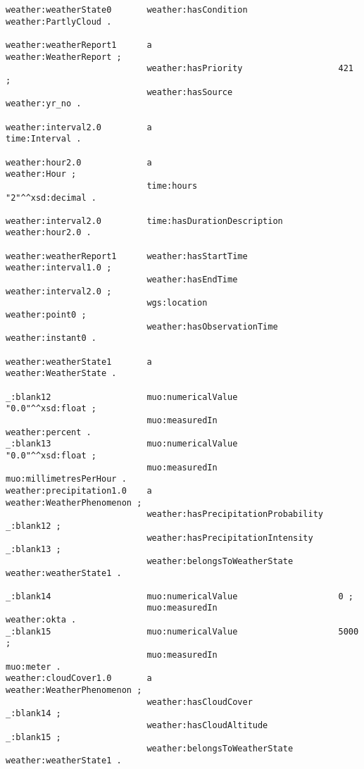 \begin{lstlisting}
weather:weatherState0       weather:hasCondition                  weather:PartlyCloud .

weather:weatherReport1      a                                     weather:WeatherReport ;
                            weather:hasPriority                   421 ;
                            weather:hasSource                     weather:yr_no .

weather:interval2.0         a                                     time:Interval .

weather:hour2.0             a                                     weather:Hour ;
                            time:hours                            "2"^^xsd:decimal .

weather:interval2.0         time:hasDurationDescription           weather:hour2.0 .

weather:weatherReport1      weather:hasStartTime                  weather:interval1.0 ;
                            weather:hasEndTime                    weather:interval2.0 ;
                            wgs:location                          weather:point0 ;
                            weather:hasObservationTime            weather:instant0 .

weather:weatherState1       a                                     weather:WeatherState .

_:blank12                   muo:numericalValue                    "0.0"^^xsd:float ;
                            muo:measuredIn                        weather:percent .
_:blank13                   muo:numericalValue                    "0.0"^^xsd:float ;
                            muo:measuredIn                        muo:millimetresPerHour .
weather:precipitation1.0    a                                     weather:WeatherPhenomenon ;
                            weather:hasPrecipitationProbability   _:blank12 ;
                            weather:hasPrecipitationIntensity     _:blank13 ;
                            weather:belongsToWeatherState         weather:weatherState1 .

_:blank14                   muo:numericalValue                    0 ;
                            muo:measuredIn                        weather:okta .
_:blank15                   muo:numericalValue                    5000 ;
                            muo:measuredIn                        muo:meter .
weather:cloudCover1.0       a                                     weather:WeatherPhenomenon ;
                            weather:hasCloudCover                 _:blank14 ;
                            weather:hasCloudAltitude              _:blank15 ;
                            weather:belongsToWeatherState         weather:weatherState1 .


\end{lstlisting}
